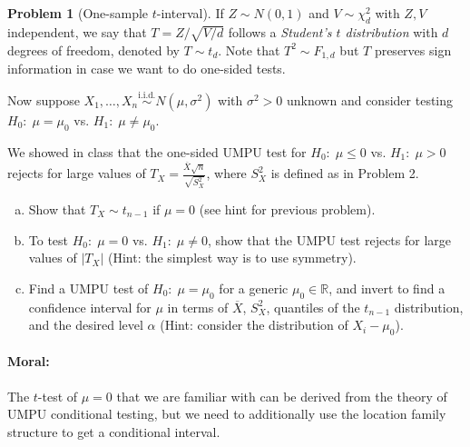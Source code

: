 \documentclass{article}
\newcommand{\RR}{\mathbb{R}}
\newcommand{\simiid}{\overset{\text{i.i.d.}}{\sim}}
\theoremstyle{definition}
\newtheorem{problem}{Problem}
\begin{document}
\begin{problem}[One-sample $t$-interval]
\label{prob:one-sample-t-interval}
If $Z\sim N(0,1)$ and $V \sim \chi_d^2$ with $Z,V$ independent, we say that $T=Z/\sqrt{V/d}$ follows a {\em Student's $t$ distribution} with $d$ degrees of freedom, denoted by $T\sim t_d$. Note that $T^2 \sim F_{1,d}$ but $T$ preserves sign information in case we want to do one-sided tests.

Now suppose $X_1,\ldots,X_n \simiid N(\mu,\sigma^2)$ with $\sigma^2>0$ unknown and consider testing $H_0:\; \mu = \mu_0$ vs. $H_1:\; \mu \neq \mu_0$.

We showed in class that the one-sided UMPU test for $H_0:\;\mu \leq 0$ vs. $H_1:\; \mu > 0$ rejects for large values of $T_X = \frac{\overline X \sqrt{n}}{\sqrt{S_X^2}}$, where $S_X^2$ is defined as in Problem 2.

\begin{enumerate}[(a)]
\item Show that $T_X\sim t_{n-1}$ if $\mu = 0$ (see hint for previous problem).




\item To test $H_0:\;\mu=0$ vs. $H_1:\; \mu \neq 0$, show that the UMPU test rejects for large values of $|T_X|$ (Hint: the simplest way is to use symmetry).



\item Find a UMPU test of $H_0:\; \mu = \mu_0$ for a generic $\mu_0\in\RR$, and invert to find a confidence interval for $\mu$ in terms of $\overline X$, $S_X^2$, quantiles of the $t_{n-1}$ distribution, and the desired level $\alpha$ (Hint: consider the distribution of $X_i-\mu_0$).



\end{enumerate}

\paragraph{Moral:} The $t$-test of $\mu=0$ that we are familiar with can be derived from the theory of UMPU conditional testing, but we need to additionally use the location family structure to get a conditional interval.

\end{problem}
\end{document}
